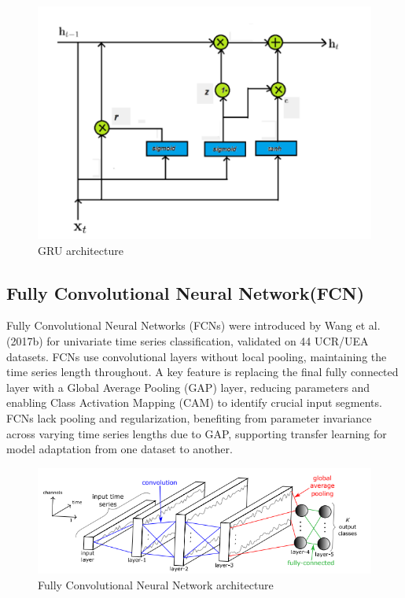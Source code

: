\documentclass{ieeeojies}
\begin{document}
\begin{figure}[H]
    \centering
\begin{minipage}{0.5\textwidth}
        \centering
        \includegraphics[width=\textwidth]{bibliography/Figure/GRU_diagram.png}
        \caption{GRU architecture}
        \label{fig:3}
\end{minipage}
\end{figure}

\subsection{Fully Convolutional Neural Network(FCN)}
Fully Convolutional Neural Networks (FCNs) were introduced by Wang et al. (2017b) for univariate time series classification, validated on 44 UCR/UEA datasets. FCNs use convolutional layers without local pooling, maintaining the time series length throughout. A key feature is replacing the final fully connected layer with a Global Average Pooling (GAP) layer, reducing parameters and enabling Class Activation Mapping (CAM) to identify crucial input segments. 
FCNs lack pooling and regularization, benefiting from parameter invariance across varying time series lengths due to GAP, supporting transfer learning for model adaptation from one dataset to another.\cite{Ismail}

\begin{figure}[H]
    \centering
\begin{minipage}{0.5\textwidth}
        \centering
        \includegraphics[width=\textwidth]{bibliography/Figure/FCN.png}
        \caption{Fully Convolutional Neural Network architecture}
        \label{fig:3}
\end{minipage}
\end{figure}
\end{document}
